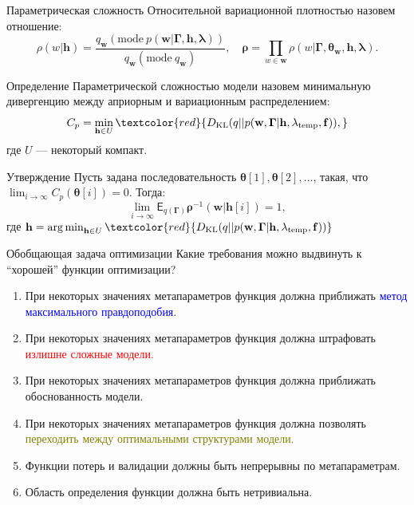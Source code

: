\documentclass[10pt,pdf,utf8,russian,aspectratio=169]{beamer}
\DeclareMathOperator*{\argmin}{arg\,min}
\begin{document}
\begin{frame}{Параметрическая сложность}
Относительной вариационной   плотностью  назовем отношение:
\[
\rho(w| \mathbf{h})=\frac{q_\mathbf{w}(\text{mode}~p(\mathbf{w}|\boldsymbol{\Gamma}, \mathbf{h}, \boldsymbol{\lambda}))}{q_\mathbf{w}(\text{mode}~{q_\mathbf{w}})},\quad  \boldsymbol{\rho} = \prod_{w \in \mathbf{w}} \rho(w|\boldsymbol{\Gamma},\boldsymbol{\theta}_\mathbf{w}, \mathbf{h},\boldsymbol{\lambda}).
\]

\begin{block}{Определение}
Параметрической сложностью модели назовем минимальную дивергенцию между априорным и вариационным распределением:
\vspace{-0.2cm}
\[
    C_p = \min_{\mathbf{h} \in U} \textcolor{red}{D_\text{KL}(q||p(\mathbf{w}, \boldsymbol{\Gamma}|\mathbf{h},\lambda_\text{temp}, \mathbf{f})),}
\]
где $U$ --- некоторый компакт.
\end{block}
\vspace{-0.2cm}
\begin{block}{Утверждение}
Пусть задана последовательность
$\boldsymbol{\theta}[1],\boldsymbol{\theta}[2], \dots$, такая, что $\lim_{i \to \infty}C_p(\boldsymbol{\theta}[i]) = 0.$
Тогда:
\footnotesize
$$
   \lim_{i \to \infty} \mathsf{E}_{q(\boldsymbol{\Gamma})} \boldsymbol{\rho}^{-1} (\mathbf{w}|\mathbf{h}[i]) = 1,
$$
где $\mathbf{h} = \argmin_{\mathbf{h} \in U} \textcolor{red}{D_\text{KL}(q||p(\mathbf{w}, \boldsymbol{\Gamma}|\mathbf{h},\lambda_\text{temp}, \mathbf{f}))}$
\end{block}

\end{frame}


\begin{frame}{Обобщающая задача оптимизации}
Какие требования можно выдвинуть к ``хорошей'' функции оптимизации?
\begin{enumerate}
\item При некоторых значениях метапараметров функция должна приближать \textcolor{blue}{метод максимального правдоподобия}.
\item При некоторых значениях метапараметров функция должна штрафовать \textcolor{red}{излишне сложные модели.}
\item При некоторых значениях метапараметров функция должна приближать обоснованность модели.
\item При некоторых значениях метапараметров функция должна позволять \textcolor{olive}{переходить между оптимальными структурами модели.}
\item Функции потерь и валидации должны быть непрерывны по метапараметрам.
\item Область определения функции должна быть нетривиальна.
\end{enumerate}
\end{frame}
\end{document}
